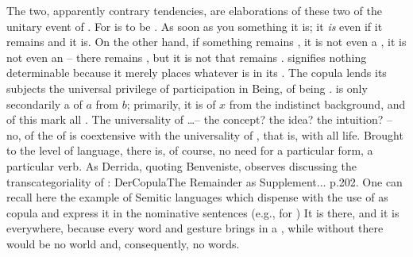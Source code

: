 The two, apparently contrary tendencies, are elaborations of these two
 of the unitary event of . For  is to be
. As soon as you  something it is; it {\em is}
even if it remains  and   it is. On the other
hand, if something remains , it is not even a
, it is not even an  -- there remains ,
but it is not  that remains .
%
\label{pa:univocity}  signifies nothing determinable because it
merely places whatever is  in its  
. The copula lends its subjects the universal
privilege of participation in Being, of being . 
 is only secondarily a 
of $a$ from $b$; primarily, it is  of $x$ from the indistinct
background, and  of this  mark all . 
The universality of \ldots -- the concept?  the idea?  the intuition?  -- no, of
the  of  is coextensive with the universality of
, that is, with all life.  Brought to the level of language,
there is, of course, no need for a particular form, a particular verb.  As
Derrida, quoting Benveniste, observes discussing the transcategoriality of
: \citet{the 
  strangeness is in the facts -- that the verb of existence, out of all verbs,
  has this privilege of being present in an utterance in which it does not
  appear.}{DerCopula}{The Remainder as Supplement... p.202. One can recall
  here the example of Semitic languages which dispense with the use of  as copula and express it in the nominative sentences (e.g.,  for )}  It is there, and it
is everywhere, because every word and gesture brings in a ,
while without  there would be no world and, consequently, no
words.

